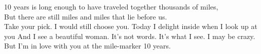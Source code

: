 \documentclass[
]{article}
\begin{document}
10 years is long enough to have traveled together thousands of miles,\\
But there are still miles and miles that lie before us.\\
Take your pick. I would still choose you. Today I delight inside when I
look up at you And I see a beautiful woman. It's not words. It's what I
see. I may be crazy. But I'm in love with you at the mile-marker 10
years.
\end{document}
